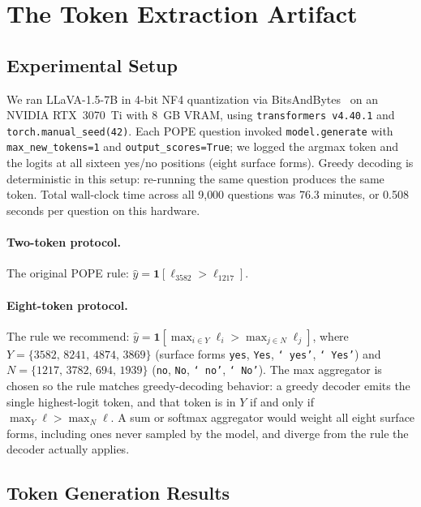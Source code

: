 \documentclass[11pt,letterpaper]{article}
\begin{document}
\section{The Token Extraction Artifact}
\label{sec:artifact}

\subsection{Experimental Setup}

We ran LLaVA-1.5-7B in 4-bit NF4 quantization via
BitsAndBytes~\citep{dettmers2023qlora} on an NVIDIA RTX~3070~Ti with
8~GB VRAM, using \texttt{transformers v4.40.1} and
\texttt{torch.manual\_seed(42)}. Each POPE question invoked
\texttt{model.generate} with \texttt{max\_new\_tokens=1} and
\texttt{output\_scores=True}; we logged the argmax token and the logits
at all sixteen yes/no positions (eight surface forms). Greedy decoding
is deterministic in this setup: re-running the same question produces
the same token. Total wall-clock time across all 9{,}000 questions was
76.3 minutes, or 0.508 seconds per question on this hardware.

\paragraph{Two-token protocol.} The original POPE rule:
$\hat{y} = \mathbf{1}[\ell_{3582} > \ell_{1217}]$.

\paragraph{Eight-token protocol.} The rule we recommend:
$\hat{y} = \mathbf{1}[\max_{i \in Y} \ell_i > \max_{j \in N} \ell_j]$,
where $Y = \{3582,\, 8241,\, 4874,\, 3869\}$ (surface forms
\texttt{yes}, \texttt{Yes}, \texttt{`\,yes'}, \texttt{`\,Yes'}) and
$N = \{1217,\, 3782,\, 694,\, 1939\}$ (\texttt{no}, \texttt{No},
\texttt{`\,no'}, \texttt{`\,No'}). The max aggregator is chosen so the
rule matches greedy-decoding behavior: a greedy decoder emits the single
highest-logit token, and that token is in $Y$ if and only if
$\max_{Y} \ell > \max_{N} \ell$. A sum or softmax aggregator would
weight all eight surface forms, including ones never sampled by the
model, and diverge from the rule the decoder actually applies.

\subsection{Token Generation Results}
\end{document}
